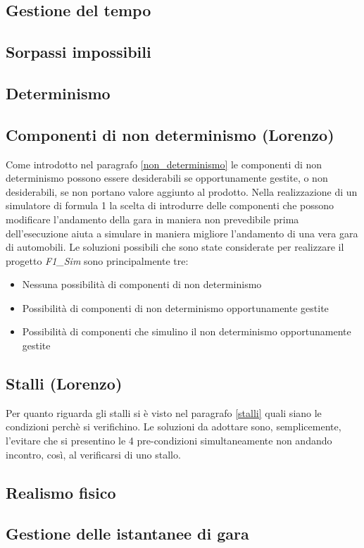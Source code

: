 \label{analisi_soluzioni}
\subsection{Gestione del tempo}
\subsection{Sorpassi impossibili}
\subsection{Determinismo}
\subsection{Componenti di non determinismo (Lorenzo)}
Come introdotto nel paragrafo \ref{non_determinismo} le componenti di non determinismo possono essere desiderabili se opportunamente gestite, o non desiderabili, se non portano valore aggiunto al prodotto. Nella realizzazione di un simulatore di formula 1 la scelta di introdurre delle componenti che possono modificare l'andamento della gara in maniera non prevedibile prima dell'esecuzione aiuta a simulare in maniera migliore l'andamento di una vera gara di automobili. Le soluzioni possibili che sono state considerate per realizzare il progetto \emph{F1\_Sim} sono principalmente tre:
\begin{itemize}
\item Nessuna possibilit\`{a} di componenti di non determinismo
\item Possibilit\`{a} di componenti di non determinismo opportunamente gestite
\item Possibilit\`{a} di componenti che simulino il non determinismo opportunamente gestite
\end{itemize}
\subsection{Stalli (Lorenzo)}
Per quanto riguarda gli stalli si \`{e} visto nel paragrafo \ref{stalli} quali siano le condizioni perch\`{e} si verifichino. Le soluzioni da adottare sono, semplicemente, l'evitare che si presentino le 4 pre-condizioni simultaneamente non andando incontro, cos\`{i}, al verificarsi di uno stallo.
\subsection{Realismo fisico}
\subsection{Gestione delle istantanee di gara}

